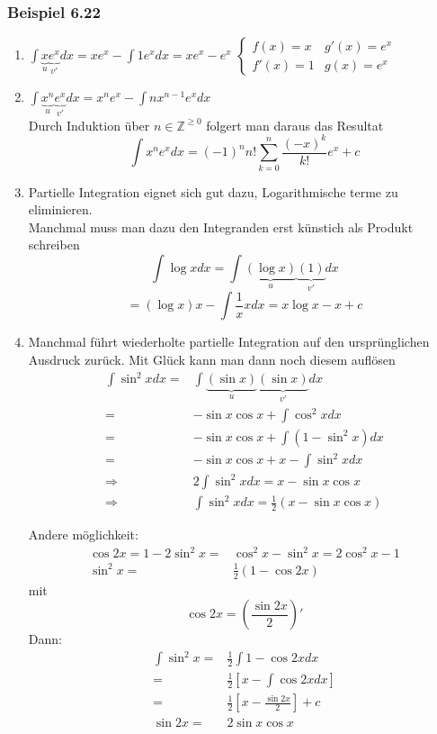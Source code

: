 \subsubsection*{Beispiel 6.22}
\begin{enumerate}
\item $\int {\underbrace x_u\underbrace {{e^x}}_{v'}dx = x{e^x} - \int {1{e^x}dx} } =x e^x - e^x$
$\left\{\begin{array}{cc} f(x)=x & g'(x)=e^x \\ f'(x)=1 & g(x)=e^x\end{array}\right.$

\item $\int {\underbrace {{x^n}}_u\underbrace {{e^x}}_{v'}dx = {x^n}{e^x} - \int {n{x^{n - 1}}{e^x}dx} } $\\
Durch Induktion über $n\in\mathbb{Z}^{\geq 0}$ folgert man daraus das Resultat \[\int {{x^n}{e^x}dx = {{( - 1)}^n}n!\sum\limits_{k = 0}^n {\frac{{{{( - x)}^k}}}{{k!}}{e^x} + c} } \]

\item Partielle Integration eignet sich gut dazu, Logarithmische terme zu eliminieren.\\
Manchmal muss man dazu den Integranden erst künstich als Produkt schreiben
\[\int {\log xdx = \int {\underbrace {(\log x)}_u\underbrace {(1)}_{v'}dx} } \]
\[ = (\log x)x - \int {\frac{1}{x}} xdx = x\log x - x + c\]

\item Manchmal führt wiederholte partielle Integration auf den ursprünglichen Ausdruck zurück. Mit Glück kann man dann noch diesem auflösen 
\begin{align*}
\int {{{\sin }^2}xdx} =&\int {\underbrace {(\sin x)}_u\underbrace {(\sin x)}_{v'}dx}  \\
 =&- \sin x\cos x + \int {{{\cos }^2}xdx}\\
 =&- \sin x\cos x + \int {(1 - {{\sin }^2}x)dx}\\
 =&- \sin x\cos x + x - \int {{{\sin }^2}xdx} \\
\Rightarrow&2\int {{{\sin }^2}xdx = x - \sin x\cos x} \\
\Rightarrow&\int {{{\sin }^2}xdx = \frac{1}{2}\left( {x - \sin x\cos x}  \right)} 
\end{align*}


Andere möglichkeit:
\begin{align*}
\cos 2x = 1-2\sin^2x=&\cos^2x-\sin^2x=2\cos^2x-1\\
\sin^2x=&\frac{1}{2}(1-\cos 2x)
\end{align*}
mit 
\[\cos 2x=\left(\frac{\sin 2x}{2} \right)'\]
Dann: 
\begin{align*}
\int{\sin^2 x}=&\frac{1}{2}\int{1-\cos 2x dx}\\
=&\frac{1}{2}\left[ x-\int{\cos 2x dx}\right]\\
=&\frac{1}{2}\left[ x-\frac{\sin 2x}{2}\right] +c\\
\sin 2x=&2\sin x\cos x
\end{align*}
\end{enumerate}

